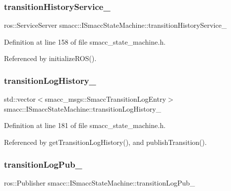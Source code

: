 \subsubsection{\texorpdfstring{transition\+History\+Service\+\_\+}{transitionHistoryService\_}}
{\footnotesize\ttfamily ros\+::\+Service\+Server smacc\+::\+I\+Smacc\+State\+Machine\+::transition\+History\+Service\+\_\+\hspace{0.3cm}{\ttfamily [protected]}}



Definition at line 158 of file smacc\+\_\+state\+\_\+machine.\+h.



Referenced by initialize\+R\+O\+S().

\mbox{\label{classsmacc_1_1ISmaccStateMachine_af682d5fce5bb7c959e2b8814dae50023}} 
\subsubsection{\texorpdfstring{transition\+Log\+History\+\_\+}{transitionLogHistory\_}}
{\footnotesize\ttfamily std\+::vector$<$smacc\+\_\+msgs\+::\+Smacc\+Transition\+Log\+Entry$>$ smacc\+::\+I\+Smacc\+State\+Machine\+::transition\+Log\+History\+\_\+\hspace{0.3cm}{\ttfamily [private]}}



Definition at line 181 of file smacc\+\_\+state\+\_\+machine.\+h.



Referenced by get\+Transition\+Log\+History(), and publish\+Transition().

\mbox{\label{classsmacc_1_1ISmaccStateMachine_acc42eb050325c1edc77d81675fb1286a}} 
\subsubsection{\texorpdfstring{transition\+Log\+Pub\+\_\+}{transitionLogPub\_}}
{\footnotesize\ttfamily ros\+::\+Publisher smacc\+::\+I\+Smacc\+State\+Machine\+::transition\+Log\+Pub\+\_\+\hspace{0.3cm}{\ttfamily [protected]}}



